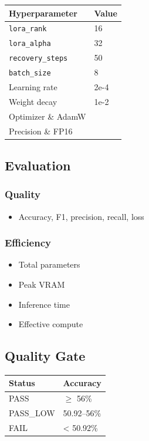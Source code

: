 \begin{table}[H]
\centering
\small
\begin{tabular}{ll}
\toprule
\textbf{Hyperparameter} & \textbf{Value} \\
\midrule
\texttt{lora\_rank} & 16 \\
\texttt{lora\_alpha} & 32 \\
\texttt{recovery\_steps} & 50 \\
\texttt{batch\_size} & 8 \\
Learning rate & 2e-4 \\
Weight decay & 1e-2 \\
Optimizer \& AdamW \\
Precision \& FP16 \\
\bottomrule
\end{tabular}
\end{table}

\subsection{Evaluation}

\subsubsection{Quality}
\begin{itemize}
\item Accuracy, F1, precision, recall, loss

\end{itemize}
\subsubsection{Efficiency}
\begin{itemize}
\item Total parameters
\item Peak VRAM
\item Inference time
\item Effective compute

\end{itemize}
\subsection{Quality Gate}

\begin{table}[H]
\centering
\small
\begin{tabular}{ll}
\toprule
\textbf{Status} & \textbf{Accuracy} \\
\midrule
PASS & $\ge$ 56\% \\
PASS\_LOW & 50.92--56\% \\
FAIL & \textless{} 50.92\% \\
\bottomrule
\end{tabular}
\end{table}

